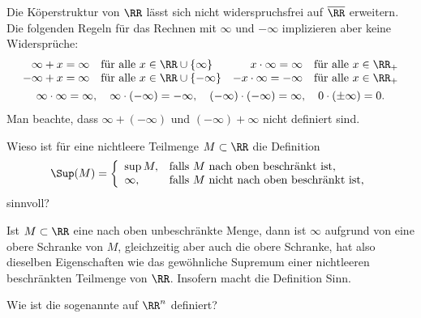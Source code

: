 \begin{antwort}
  Die Köperstruktur von $\RR$ lässt sich nicht widerspruchsfrei  
  auf $\overline{\RR}$ erweitern. Die folgenden Regeln 
  für das Rechnen mit $\infty$ und $-\infty$ implizieren aber keine 
  Widersprüche:   
  \begin{gather}
    \begin{array}{rlrl}
      \infty + x = \infty & \text{f\"ur alle $x\in\RR\cup\{\infty\}$} & 
      x \cdot \infty = \infty & \text{f\"ur alle $x\in\RR_+$} \\
      -\infty + x = \infty & \text{f\"ur alle $x\in\RR\cup\{-\infty\}$} &
      -x \cdot \infty = -\infty & \text{f\"ur alle $x\in\RR_+$} \\
    \end{array}  \notag \\
    \infty \cdot \infty = \infty, \quad 
    \infty \cdot (-\infty ) = -\infty, \quad
    (-\infty) \cdot(- \infty) = \infty, \quad 
    0\cdot (\pm\infty)=0.\notag
  \end{gather}
  Man beachte, dass $\infty +(-\infty)$ und $(-\infty)+\infty$ nicht 
  definiert sind. \AntEnd
\end{antwort}

\begin{frage}
  Wieso ist f\"ur eine nichtleere Teilmenge $M\subset\RR$ die Definition
  \[
  \Sup( M) = \left\{ \begin{array}{ll} \sup M, & \text{falls $M$ nach oben beschr\"ankt ist,}\\
      \infty, & \text{falls $M$ nicht nach oben beschr\"ankt ist,}
    \end{array}\right.
  \]
  sinnvoll?
\end{frage}

\begin{antwort}
  Ist $M \subset \RR$ eine nach oben unbeschr\"ankte Menge, dann 
  ist $\infty$ aufgrund von {\astref} eine obere Schranke von $M$, 
  gleichzeitig aber auch die  obere Schranke, hat 
  also dieselben Eigenschaften wie das gew\"ohnliche Supremum einer 
  nichtleeren beschr\"ankten Teilmenge von $\RR$. Insofern macht die 
  Definition Sinn.
  \AntEnd 
\end{antwort}

\begin{frage}
  Wie ist die sogenannte  auf $\RR^n$ definiert?
\end{frage}

